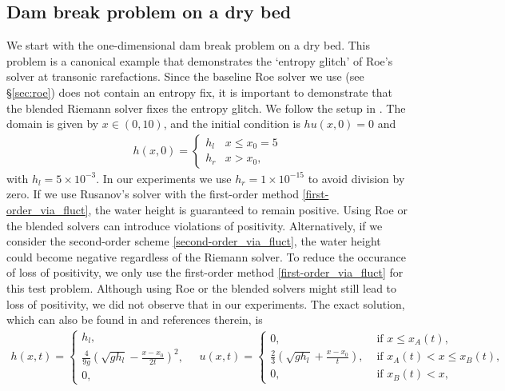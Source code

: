 \documentclass[preprint, 11pt]{article}
\begin{document}
\subsection{Dam break problem on a dry bed}\label{sec:rp_dry_bed}
We start with the one-dimensional dam break problem on a dry bed.
This problem is a canonical example that demonstrates the `entropy glitch' of Roe's solver
at transonic rarefactions. Since the baseline Roe solver we use (see \S\ref{sec:roe}) does not contain
an entropy fix, it is important to demonstrate that the blended Riemann solver fixes the entropy glitch.
We follow the setup in \cite[\S 4.1.2]{delestre2013swashes}.
The domain is given by $x\in(0,10)$, and the initial condition is $hu(x,0)=0$ and
\begin{align*}
  h(x,0)=
  \begin{cases}
    h_l & x\leq x_0=5 \\
    h_r & x >x_0,
  \end{cases}
\end{align*}
with $h_l=5\times 10^{-3}$.  In our experiments we use $h_r=1\times
10^{-15}$ to avoid division by zero.
{\color{OliveGreen}
If we use Rusanov's solver with the first-order method \eqref{first-order_via_fluct}, 
the water height is guaranteed to remain positive. Using Roe or the blended solvers 
can introduce violations of positivity. Alternatively, if we consider the second-order scheme 
\eqref{second-order_via_fluct}, the water height could become negative regardless of the Riemann solver.
To reduce the occurance of loss of positivity, we only use the first-order method 
\eqref{first-order_via_fluct} for this test problem. 
Although using Roe or the blended solvers might still lead to loss of positivity, we 
did not observe that in our experiments.}
The exact solution, which can also be found in \cite{delestre2013swashes} and references therein, is
\begin{align*}
  h(x,t) =
  \begin{cases}
    h_l, \\
    \frac{4}{9g}\left(\sqrt{gh_l}-\frac{x-x_0}{2t}\right)^2, \\
    0,
  \end{cases}
\quad
  u(x,t) =
  \begin{cases}
    0, &\mbox{ if } x\leq x_A(t), \\
    \frac{2}{3}\left(\sqrt{gh_l}+\frac{x-x_0}{t}\right), & \mbox{ if } x_A(t) < x\leq x_B(t), \\
    0, &\mbox{ if } x_B(t) < x,
  \end{cases}
\end{align*}
\end{document}
